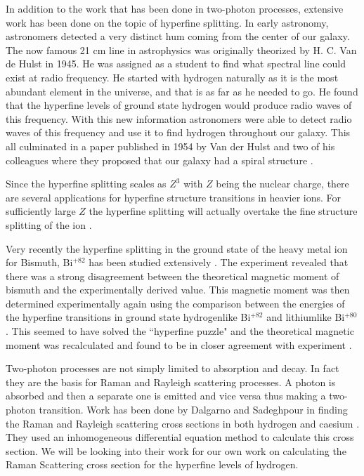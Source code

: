 In addition to the work that has been done in two-photon processes, extensive work has been done on the topic of hyperfine splitting. In early astronomy, astronomers detected a very distinct hum coming from the center of our galaxy. The now famous 21 cm line in astrophysics was originally theorized by H. C. Van de Hulst in 1945. He was assigned as a student to find what spectral line could exist at radio frequency. He started with hydrogen naturally as it is the most abundant element in the universe, and that is as far as he needed to go. He found that the hyperfine levels of ground state hydrogen would produce radio waves of this frequency. With this new information astronomers were able to detect radio waves of this frequency and use it to find hydrogen throughout our galaxy. This all culminated in a paper published in 1954 by Van der Hulst and two of his colleagues where they proposed that our galaxy had a spiral structure \cite{astro}.

Since the hyperfine splitting scales as \(Z^3\) with $Z$ being the nuclear charge, there are several applications for hyperfine structure transitions in heavier ions. For sufficiently large $Z$ the hyperfine splitting will actually overtake the fine structure splitting of the ion \cite{woodgate}. 

Very recently the hyperfine splitting in the ground state of the heavy metal ion for Bismuth, Bi\(^{+82}\) has been studied extensively \cite{mangeticmome}. The experiment revealed that there was a strong disagreement between the theoretical magnetic moment of bismuth and the experimentally derived value. This magnetic moment was then determined experimentally again using the comparison between the energies of the hyperfine transitions in ground state hydrogenlike Bi\(^{+82}\) and lithiumlike Bi\(^{+80}\). This seemed to have solved the ``hyperfine puzzle" and the theoretical magnetic moment was recalculated and found to be in closer agreement with experiment \cite{hyperfinepuzz}.

Two-photon processes are not simply limited to absorption and decay. In fact they are the basis for Raman and Rayleigh scattering processes. A photon is absorbed and then a separate one is emitted and vice versa thus making a two-photon transition. Work has been done by Dalgarno and Sadeghpour in finding the Raman and Rayleigh scattering cross sections in both hydrogen and caesium \cite{dalgarnoraman}. They used an inhomogeneous differential equation method to calculate this cross section. We will be looking into their work for our own work on calculating the Raman Scattering cross section for the hyperfine levels of hydrogen. 

